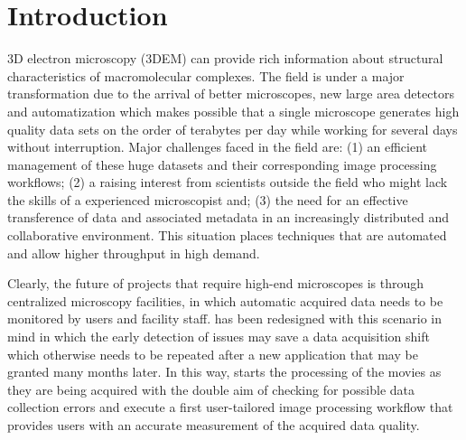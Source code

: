 
\section{Introduction}

3D electron microscopy (3DEM)  can provide rich information about structural characteristics of macromolecular complexes. The field is under a major transformation due to the arrival of better microscopes, new large area detectors and automatization \citep{kuhlbrandt2014a, Kuhlbrandt2014b}  which makes possible that a single microscope generates high quality data sets on the order of terabytes per day \citep{Saibil2015} while working for several days without interruption. Major challenges faced in the field are: (1) an efficient management of these huge datasets and their corresponding image processing workflows; (2) a raising interest from scientists outside the field who might lack the skills of a experienced microscopist and; (3) the need for an effective transference of data and associated metadata in an increasingly distributed and collaborative environment. This situation places techniques that are automated and allow higher throughput in high demand. 



Clearly, the future of projects that require high-end microscopes is through centralized microscopy facilities, in which automatic acquired data needs to be monitored by users and facility staff. \scipion has been redesigned with this scenario in mind in which the early detection of issues may save a data acquisition shift which otherwise needs to be repeated after a new application that may be granted many months later. In this way, \scipion starts the processing of the movies as they are being acquired with the double aim of checking for possible data collection errors and execute a first user-tailored image processing workflow that provides users with an accurate measurement of the acquired data quality.

